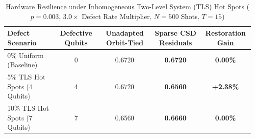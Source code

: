 \begin{table}[t]
\caption{Hardware Resilience under Inhomogeneous Two-Level System (TLS) Hot Spots ($p = 0.003$, $3.0\times$ Defect Rate Multiplier, $N=500$ Shots, $T=15$)}
\label{tab:inhomogeneous_tls}
\centering
\begin{tabular}{lcccc}
\toprule
\textbf{Defect Scenario} & \textbf{Defective Qubits} & \textbf{Unadapted Orbit-Tied} & \textbf{Sparse CSD Residuals} & \textbf{Restoration Gain} \\
\midrule
0\% Uniform (Baseline) & 0 & 0.6720 & \textbf{0.6720} & \textbf{0.00\%} \\
5\% TLS Hot Spots (4 Qubits) & 4 & 0.6720 & \textbf{0.6560} & \textbf{+2.38\%} \\
10\% TLS Hot Spots (7 Qubits) & 7 & 0.6560 & \textbf{0.6660} & \textbf{0.00\%} \\
\bottomrule
\end{tabular}
\end{table}
